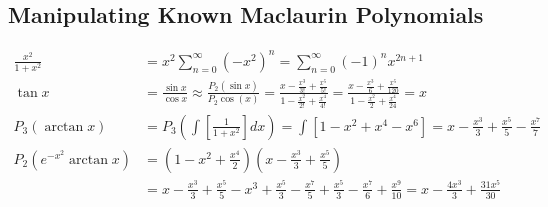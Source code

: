\documentclass[12pt, A4]{article}
\begin{document}
		\subsection{Manipulating Known Maclaurin Polynomials}
			\begin{align*}
				\frac{x^2}{1 + x^2} &= x^2\sum_{n = 0}^\infty\left(-x^2\right)^n = \sum_{n = 0}^\infty\left(-1\right)^nx^{2n + 1} \\
				\tan x &= \frac{\sin x}{\cos x} \approx \frac{P_2(\sin x)}{P_2\cos(x)} = \frac{x - \frac{x^3}{3!} + \frac{x^5}{5!}}{1 - \frac{x^2}{2!} + \frac{x^4}{4!}} = \frac{x - \frac{x^3}{6} + \frac{x^5}{120}}{1 - \frac{x^2}{2} + \frac{x^4}{24}} = x \\
				P_3(\arctan x) &= P_3\left(\int\left[\frac{1}{1 + x^2}\right]dx\right) = \int\left[1 - x^2 + x^4 - x^6\right] = x - \frac{x^3}{3} + \frac{x^5}{5} - \frac{x^7}{7} \\
				P_2\left(e^{-x^2}\arctan{x}\right) &= \left(1 - x^2 + \frac{x^4}{2}\right)\left(x - \frac{x^3}{3} + \frac{x^5}{5}\right) \\
					&= x - \frac{x^3}{3} + \frac{x^5}{5} - x^3 + \frac{x^5}{3} - \frac{x^7}{5} + \frac{x^5}{3} - \frac{x^7}{6} + \frac{x^9}{10} = x - \frac{4x^3}{3} + \frac{31x^5}{30}
			\end{align*}
\end{document}
